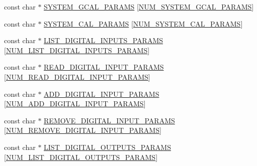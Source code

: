 \begin{DoxyCompactItemize}
\item 
const char $\ast$ \hyperlink{group__command__interpreter_ga12cbb3a7ff1264641a75db037130c062}{S\-Y\-S\-T\-E\-M\-\_\-\-G\-C\-A\-L\-\_\-\-P\-A\-R\-A\-M\-S} \mbox{[}\hyperlink{group__command__interpreter_ga5ee0ee8ce38b367ad3e68b77020ddc66}{N\-U\-M\-\_\-\-S\-Y\-S\-T\-E\-M\-\_\-\-G\-C\-A\-L\-\_\-\-P\-A\-R\-A\-M\-S}\mbox{]}
\item 
const char $\ast$ \hyperlink{group__command__interpreter_ga012ad2ab047f56ee2f1bbe24441f46d3}{S\-Y\-S\-T\-E\-M\-\_\-\-C\-A\-L\-\_\-\-P\-A\-R\-A\-M\-S} \mbox{[}\hyperlink{group__command__interpreter_gab61f2dda81ab965fb510863070474767}{N\-U\-M\-\_\-\-S\-Y\-S\-T\-E\-M\-\_\-\-C\-A\-L\-\_\-\-P\-A\-R\-A\-M\-S}\mbox{]}
\item 
const char $\ast$ \hyperlink{group__command__interpreter_ga37e4457ed0cb0dabb34ffcd740d59ed7}{L\-I\-S\-T\-\_\-\-D\-I\-G\-I\-T\-A\-L\-\_\-\-I\-N\-P\-U\-T\-S\-\_\-\-P\-A\-R\-A\-M\-S} \mbox{[}\hyperlink{group__command__interpreter_ga5ad550260c3e06471bddb5c3a8aaba04}{N\-U\-M\-\_\-\-L\-I\-S\-T\-\_\-\-D\-I\-G\-I\-T\-A\-L\-\_\-\-I\-N\-P\-U\-T\-S\-\_\-\-P\-A\-R\-A\-M\-S}\mbox{]}
\item 
const char $\ast$ \hyperlink{group__command__interpreter_ga26d009205a856ee4c4c6e6c3b363f188}{R\-E\-A\-D\-\_\-\-D\-I\-G\-I\-T\-A\-L\-\_\-\-I\-N\-P\-U\-T\-\_\-\-P\-A\-R\-A\-M\-S} \mbox{[}\hyperlink{group__command__interpreter_gae9468d3d4d92a32a998fa97c0075db48}{N\-U\-M\-\_\-\-R\-E\-A\-D\-\_\-\-D\-I\-G\-I\-T\-A\-L\-\_\-\-I\-N\-P\-U\-T\-\_\-\-P\-A\-R\-A\-M\-S}\mbox{]}
\item 
const char $\ast$ \hyperlink{group__command__interpreter_ga02032c0b60b605fe89dc910a27e12582}{A\-D\-D\-\_\-\-D\-I\-G\-I\-T\-A\-L\-\_\-\-I\-N\-P\-U\-T\-\_\-\-P\-A\-R\-A\-M\-S} \mbox{[}\hyperlink{group__command__interpreter_ga9c5c1af739a3a4edde8cdb7af7df1ec5}{N\-U\-M\-\_\-\-A\-D\-D\-\_\-\-D\-I\-G\-I\-T\-A\-L\-\_\-\-I\-N\-P\-U\-T\-\_\-\-P\-A\-R\-A\-M\-S}\mbox{]}
\item 
const char $\ast$ \hyperlink{group__command__interpreter_ga26930165286ff4adccafca5650b4b4cf}{R\-E\-M\-O\-V\-E\-\_\-\-D\-I\-G\-I\-T\-A\-L\-\_\-\-I\-N\-P\-U\-T\-\_\-\-P\-A\-R\-A\-M\-S} \mbox{[}\hyperlink{group__command__interpreter_ga6096182153b5f1ed0b7c7f02337c1782}{N\-U\-M\-\_\-\-R\-E\-M\-O\-V\-E\-\_\-\-D\-I\-G\-I\-T\-A\-L\-\_\-\-I\-N\-P\-U\-T\-\_\-\-P\-A\-R\-A\-M\-S}\mbox{]}
\item 
const char $\ast$ \hyperlink{group__command__interpreter_gad3444869609f37e2fcb9ca55ac0b53ef}{L\-I\-S\-T\-\_\-\-D\-I\-G\-I\-T\-A\-L\-\_\-\-O\-U\-T\-P\-U\-T\-S\-\_\-\-P\-A\-R\-A\-M\-S} \mbox{[}\hyperlink{group__command__interpreter_ga3d5083d6431df96a397de8cfad75d3b4}{N\-U\-M\-\_\-\-L\-I\-S\-T\-\_\-\-D\-I\-G\-I\-T\-A\-L\-\_\-\-O\-U\-T\-P\-U\-T\-S\-\_\-\-P\-A\-R\-A\-M\-S}\mbox{]}

\end{DoxyCompactItemize}
